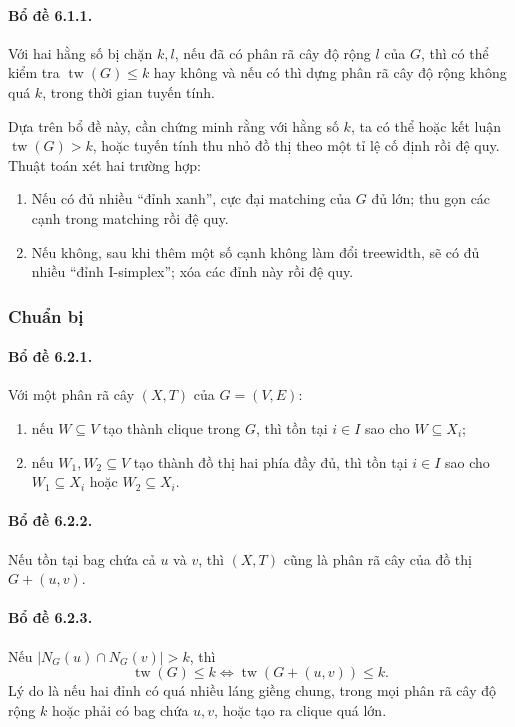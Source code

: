 \documentclass[11pt]{article}
\begin{document}
\paragraph{Bổ đề 6.1.1.}
Với hai hằng số bị chặn $k,l$, nếu đã có phân rã cây độ rộng $l$ của $G$, thì
có thể kiểm tra $\operatorname{tw}(G)\le k$ hay không và nếu có thì dựng phân
rã cây độ rộng không quá $k$, trong thời gian tuyến tính.

Dựa trên bổ đề này, cần chứng minh rằng với hằng số $k$, ta có thể hoặc kết
luận $\operatorname{tw}(G)>k$, hoặc tuyến tính thu nhỏ đồ thị theo một tỉ lệ
cố định rồi đệ quy. Thuật toán xét hai trường hợp:
\begin{enumerate}
  \item Nếu có đủ nhiều ``đỉnh xanh'', cực đại matching của $G$ đủ lớn; thu
  gọn các cạnh trong matching rồi đệ quy.
  \item Nếu không, sau khi thêm một số cạnh không làm đổi treewidth, sẽ có đủ
  nhiều ``đỉnh I-simplex''; xóa các đỉnh này rồi đệ quy.
\end{enumerate}

\subsubsection{Chuẩn bị}

\paragraph{Bổ đề 6.2.1.}
Với một phân rã cây $(X,T)$ của $G=(V,E)$:
\begin{enumerate}
  \item nếu $W\subseteq V$ tạo thành clique trong $G$, thì tồn tại $i\in I$ sao
  cho $W\subseteq X_i$;
  \item nếu $W_1,W_2\subseteq V$ tạo thành đồ thị hai phía đầy đủ, thì tồn tại
  $i\in I$ sao cho $W_1\subseteq X_i$ hoặc $W_2\subseteq X_i$.
\end{enumerate}

\paragraph{Bổ đề 6.2.2.}
Nếu tồn tại bag chứa cả $u$ và $v$, thì $(X,T)$ cũng là phân rã cây của đồ thị
$G+(u,v)$.

\paragraph{Bổ đề 6.2.3.}
Nếu $|N_G(u)\cap N_G(v)|>k$, thì
\[
  \operatorname{tw}(G)\le k \Longleftrightarrow
  \operatorname{tw}(G+(u,v))\le k.
\]
Lý do là nếu hai đỉnh có quá nhiều láng giềng chung, trong mọi phân rã cây độ
rộng $k$ hoặc phải có bag chứa $u,v$, hoặc tạo ra clique quá lớn.
\end{document}
